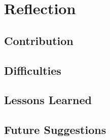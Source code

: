 \section{Reflection}
\subsection{Contribution}


\subsection{Difficulties}

\subsection{Lessons Learned}

\subsection{Future Suggestions}
